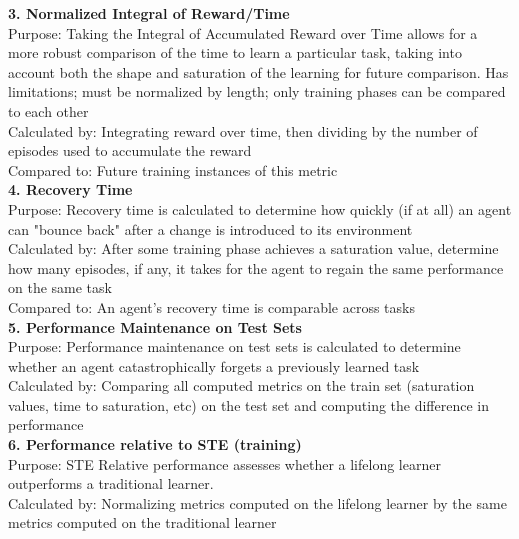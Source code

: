 \textbf{3. Normalized Integral of Reward/Time}\\
Purpose: Taking the Integral of Accumulated Reward over Time allows for a more robust comparison of the time to learn a particular task, taking into account both the shape and saturation of the learning for future comparison. Has limitations; must be normalized by length; only training phases can be compared to each other \\
Calculated by: Integrating reward over time, then dividing by the number of episodes used to accumulate the reward\\
Compared to: Future training instances of this metric\\[0.1in]


\textbf{4. Recovery Time}\\
Purpose: Recovery time is calculated to determine how quickly (if at all) an agent can "bounce back" after a change is introduced to its environment\\
Calculated by: After some training phase achieves a saturation value, determine how many episodes, if any, it takes for the agent to regain the same performance on the same task\\
Compared to: An agent's recovery time is comparable across tasks\\[0.1in]


\textbf{5. Performance Maintenance on Test Sets}\\
Purpose: Performance maintenance on test sets is calculated to determine whether an agent catastrophically forgets a previously learned task\\
Calculated by: Comparing all computed metrics on the train set (saturation values, time to saturation, etc) on the test set and computing the difference in performance\\[0.1in]


\textbf{6. Performance relative to STE (training)}\\
Purpose: STE Relative performance assesses whether a lifelong learner outperforms a traditional learner.\\
Calculated by: Normalizing metrics computed on the lifelong learner by the same metrics computed on the traditional learner\\
